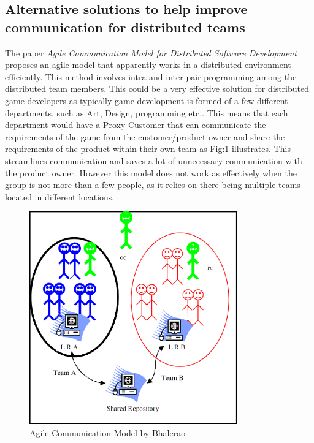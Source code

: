 \documentclass{scrartcl}
\begin{document}
\subsection{Alternative solutions to help improve communication for distributed teams}


The paper \textit{Agile Communication Model for Distributed Software Development} \cite{bhalerao2010} proposes an agile model that apparently works in a distributed environment efficiently. This method involves intra and inter pair programming among the distributed team members. 
This could be a very effective solution for distributed game developers as typically game development is formed of a few different departments, such as Art, Design, programming etc.. This means that each department would have a Proxy Customer that can communicate the requirements of the game from the customer/product owner and share the requirements of the product within their own team  as Fig:\ref{fig:ACM} illustrates. This streamlines communication and saves a lot of unnecessary communication with the product owner. However this model does not work as effectively when the group is not more than a few people, as it relies on there being multiple teams located in different locations.

\begin{figure}[p]
    \centering
    \includegraphics[width=0.8\textwidth]{ACMDSD}
    \caption{Agile Communication Model by Bhalerao\cite{bhalerao2010}}
    \label{fig:ACM}
\end{figure}
\end{document}
